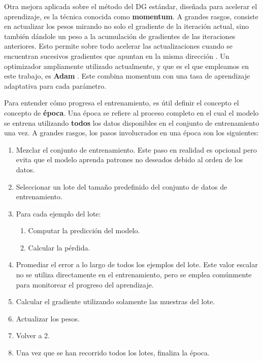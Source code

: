 \documentclass[../../main.tex]{subfiles}
\begin{document}
Otra mejora aplicada sobre el método del DG estándar, diseñada para acelerar el
aprendizaje, es la técnica conocida como \textbf{momentum}. A grandes rasgos, consiste en
actualizar los pesos mirando no solo el gradiente de la iteración actual, sino también
dándole un peso a la acumulación de gradientes de las iteraciones anteriores. Esto permite
sobre todo acelerar las actualizaciones cuando se encuentran sucesivos gradientes que
apuntan en la misma dirección \cite{deep-learning}. Un optimizador ampliamente utilizado
actualmente, y que es el que empleamos en este trabajo, es \textbf{Adam} \cite{adampaper}.
Este combina momentum con una tasa de aprendizaje adaptativa para cada parámetro.

Para entender cómo progresa el entrenamiento, es útil definir el concepto el concepto de
\textbf{época}. Una época se refiere al proceso completo en el cual el modelo se entrena
utilizando \textbf{todos} los datos disponibles en el conjunto de entrenamiento una vez. A
grandes rasgos, los pasos involucrados en una época son los siguientes:
\begin{enumerate}[itemsep=0.05cm,label=\textbf{\arabic*.}]
    \item Mezclar el conjunto de entrenamiento. Este paso en realidad es opcional
    pero evita que el modelo aprenda patrones no deseados debido al orden de los datos.
    \item Seleccionar un lote del tamaño predefinido del conjunto de datos de entrenamiento.
    \item Para cada ejemplo del lote:
    \vspace{-0.2cm}
    \begin{enumerate}[noitemsep]
        \item Computar la predicción del modelo.
        \item Calcular la pérdida.
    \end{enumerate}
    \item Promediar el error a lo largo de todos los ejemplos del lote. Este valor escalar
    no se utiliza directamente en el entrenamiento, pero se emplea comúnmente para
    monitorear el progreso del aprendizaje.
    \item Calcular el gradiente utilizando solamente las muestras del lote.
    \item Actualizar los pesos.
    \item Volver a 2.
    \item Una vez que se han recorrido todos los lotes, finaliza la época.
\end{enumerate}
\end{document}
